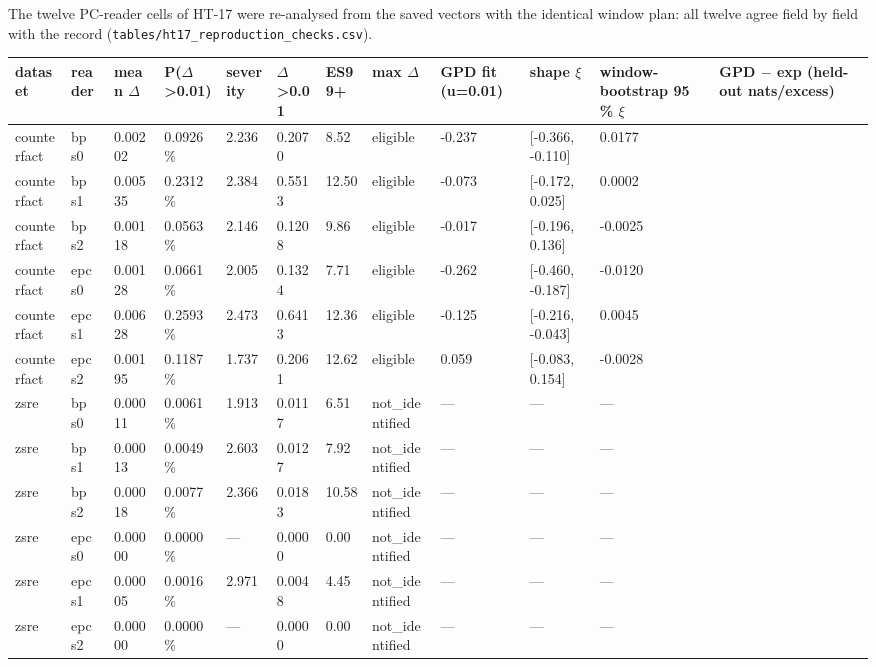 \documentclass[10pt,a4paper]{article}
\begin{document}
The twelve PC-reader cells of HT-17 were re-analysed from the saved vectors with the identical window plan: all twelve agree field by field with the record (\texttt{tables/ht17\_reproduction\_checks.csv}).



\begin{center}\tiny
\begin{tabularx}{\textwidth}{@{}p{}XXXXXXXXXXX@{}}
\toprule
dataset & reader & mean $\Delta$ & P($\Delta$>0.01) & severity & $\Delta$>0.01 & ES99+ & max $\Delta$ & GPD fit (u=0.01) & shape $\xi$ & window-bootstrap 95 \% $\xi$ & GPD $-$ exp (held-out nats/excess) \\ \midrule
counterfact & bp s0 & 0.00202 & 0.0926 \% & 2.236 & 0.2070 & 8.52 & eligible & -0.237 & [-0.366, -0.110] & 0.0177 &  \\
counterfact & bp s1 & 0.00535 & 0.2312 \% & 2.384 & 0.5513 & 12.50 & eligible & -0.073 & [-0.172, 0.025] & 0.0002 &  \\
counterfact & bp s2 & 0.00118 & 0.0563 \% & 2.146 & 0.1208 & 9.86 & eligible & -0.017 & [-0.196, 0.136] & -0.0025 &  \\
counterfact & epc s0 & 0.00128 & 0.0661 \% & 2.005 & 0.1324 & 7.71 & eligible & -0.262 & [-0.460, -0.187] & -0.0120 &  \\
counterfact & epc s1 & 0.00628 & 0.2593 \% & 2.473 & 0.6413 & 12.36 & eligible & -0.125 & [-0.216, -0.043] & 0.0045 &  \\
counterfact & epc s2 & 0.00195 & 0.1187 \% & 1.737 & 0.2061 & 12.62 & eligible & 0.059 & [-0.083, 0.154] & -0.0028 &  \\
zsre & bp s0 & 0.00011 & 0.0061 \% & 1.913 & 0.0117 & 6.51 & not\_identified & — & — & — &  \\
zsre & bp s1 & 0.00013 & 0.0049 \% & 2.603 & 0.0127 & 7.92 & not\_identified & — & — & — &  \\
zsre & bp s2 & 0.00018 & 0.0077 \% & 2.366 & 0.0183 & 10.58 & not\_identified & — & — & — &  \\
zsre & epc s0 & 0.00000 & 0.0000 \% & — & 0.0000 & 0.00 & not\_identified & — & — & — &  \\
zsre & epc s1 & 0.00005 & 0.0016 \% & 2.971 & 0.0048 & 4.45 & not\_identified & — & — & — &  \\
zsre & epc s2 & 0.00000 & 0.0000 \% & — & 0.0000 & 0.00 & not\_identified & — & — & — &  \\
\bottomrule
\end{tabularx}
\end{center}
\end{document}
